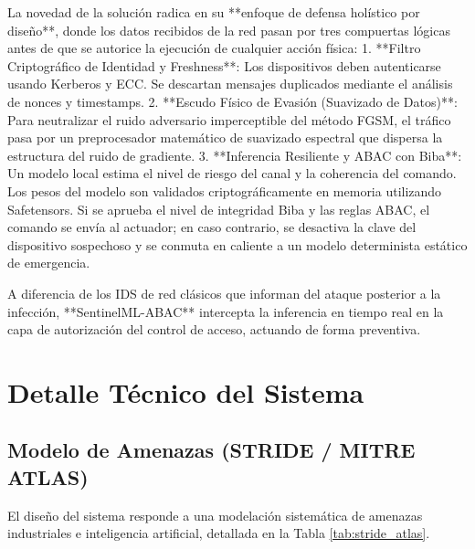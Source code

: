 \documentclass[12pt,letterpaper]{article}
\begin{document}
La novedad de la solución radica en su **enfoque de defensa holístico por diseño**, donde los datos recibidos de la red pasan por tres compuertas lógicas antes de que se autorice la ejecución de cualquier acción física:
1.  **Filtro Criptográfico de Identidad y Freshness**: Los dispositivos deben autenticarse usando Kerberos y ECC. Se descartan mensajes duplicados mediante el análisis de nonces y timestamps.
2.  **Escudo Físico de Evasión (Suavizado de Datos)**: Para neutralizar el ruido adversario imperceptible del método FGSM, el tráfico pasa por un preprocesador matemático de suavizado espectral que dispersa la estructura del ruido de gradiente.
3.  **Inferencia Resiliente y ABAC con Biba**: Un modelo local estima el nivel de riesgo del canal y la coherencia del comando. Los pesos del modelo son validados criptográficamente en memoria utilizando Safetensors. Si se aprueba el nivel de integridad Biba y las reglas ABAC, el comando se envía al actuador; en caso contrario, se desactiva la clave del dispositivo sospechoso y se conmuta en caliente a un modelo determinista estático de emergencia.

A diferencia de los IDS de red clásicos que informan del ataque posterior a la infección, **SentinelML-ABAC** intercepta la inferencia en tiempo real en la capa de autorización del control de acceso, actuando de forma preventiva.

\section{Detalle Técnico del Sistema}

\subsection{Modelo de Amenazas (STRIDE / MITRE ATLAS)}
El diseño del sistema responde a una modelación sistemática de amenazas industriales e inteligencia artificial, detallada en la Tabla \ref{tab:stride_atlas}.
\end{document}
